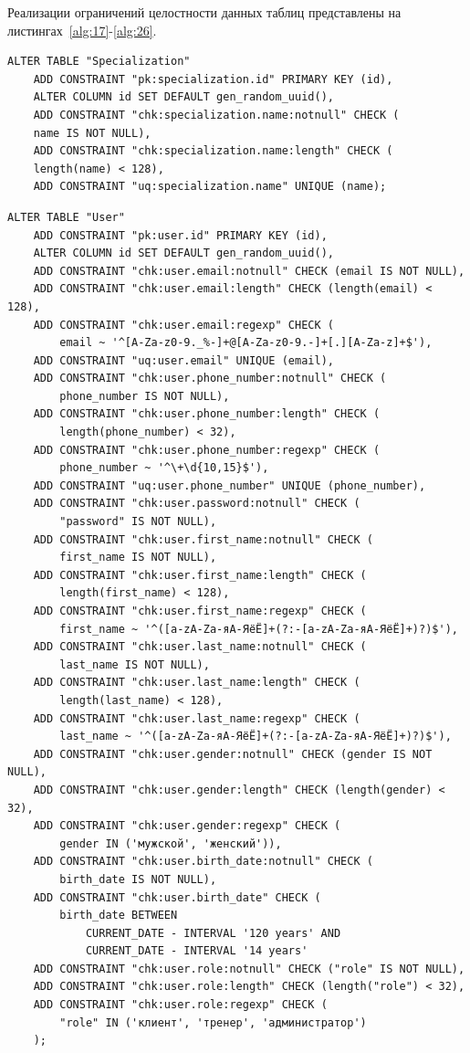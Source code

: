 Реализации ограничений целостности данных таблиц представлены на листингах~\ref{alg:17}-\ref{alg:26}.

\begin{lstlisting}[label=alg:17, caption=Реализация  ограничений целостности данных отношения Specialization, captionpos=t]
ALTER TABLE "Specialization"
	ADD CONSTRAINT "pk:specialization.id" PRIMARY KEY (id),
	ALTER COLUMN id SET DEFAULT gen_random_uuid(),
	ADD CONSTRAINT "chk:specialization.name:notnull" CHECK (
	name IS NOT NULL),
	ADD CONSTRAINT "chk:specialization.name:length" CHECK (
	length(name) < 128),
	ADD CONSTRAINT "uq:specialization.name" UNIQUE (name);
\end{lstlisting}

\newpage
\begin{lstlisting}[label=alg:14, caption=Реализация  ограничений целостности данных отношения User, captionpos=t]
ALTER TABLE "User"
	ADD CONSTRAINT "pk:user.id" PRIMARY KEY (id),
	ALTER COLUMN id SET DEFAULT gen_random_uuid(),
	ADD CONSTRAINT "chk:user.email:notnull" CHECK (email IS NOT NULL),
	ADD CONSTRAINT "chk:user.email:length" CHECK (length(email) < 128),
	ADD CONSTRAINT "chk:user.email:regexp" CHECK (
		email ~ '^[A-Za-z0-9._%-]+@[A-Za-z0-9.-]+[.][A-Za-z]+$'),
	ADD CONSTRAINT "uq:user.email" UNIQUE (email),
	ADD CONSTRAINT "chk:user.phone_number:notnull" CHECK (
		phone_number IS NOT NULL),
	ADD CONSTRAINT "chk:user.phone_number:length" CHECK (
		length(phone_number) < 32),
	ADD CONSTRAINT "chk:user.phone_number:regexp" CHECK (
		phone_number ~ '^\+\d{10,15}$'),
	ADD CONSTRAINT "uq:user.phone_number" UNIQUE (phone_number),
	ADD CONSTRAINT "chk:user.password:notnull" CHECK (
		"password" IS NOT NULL),
	ADD CONSTRAINT "chk:user.first_name:notnull" CHECK (
		first_name IS NOT NULL),
	ADD CONSTRAINT "chk:user.first_name:length" CHECK (
		length(first_name) < 128),
	ADD CONSTRAINT "chk:user.first_name:regexp" CHECK (
		first_name ~ '^([a-zA-Zа-яА-ЯёЁ]+(?:-[a-zA-Zа-яА-ЯёЁ]+)?)$'),
	ADD CONSTRAINT "chk:user.last_name:notnull" CHECK (
		last_name IS NOT NULL),
	ADD CONSTRAINT "chk:user.last_name:length" CHECK (
		length(last_name) < 128),
	ADD CONSTRAINT "chk:user.last_name:regexp" CHECK (
		last_name ~ '^([a-zA-Zа-яА-ЯёЁ]+(?:-[a-zA-Zа-яА-ЯёЁ]+)?)$'),
	ADD CONSTRAINT "chk:user.gender:notnull" CHECK (gender IS NOT NULL),
	ADD CONSTRAINT "chk:user.gender:length" CHECK (length(gender) < 32),
	ADD CONSTRAINT "chk:user.gender:regexp" CHECK (
		gender IN ('мужской', 'женский')),
	ADD CONSTRAINT "chk:user.birth_date:notnull" CHECK (
		birth_date IS NOT NULL),
	ADD CONSTRAINT "chk:user.birth_date" CHECK (
		birth_date BETWEEN 
			CURRENT_DATE - INTERVAL '120 years' AND 
			CURRENT_DATE - INTERVAL '14 years'
	ADD CONSTRAINT "chk:user.role:notnull" CHECK ("role" IS NOT NULL),
	ADD CONSTRAINT "chk:user.role:length" CHECK (length("role") < 32),
	ADD CONSTRAINT "chk:user.role:regexp" CHECK (
		"role" IN ('клиент', 'тренер', 'администратор')
	);
\end{lstlisting}

